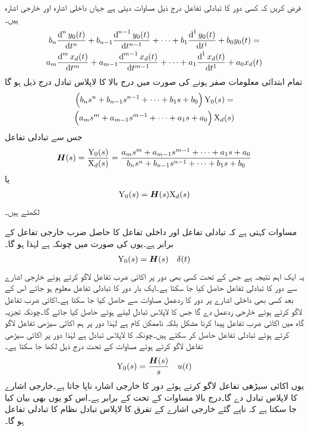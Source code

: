 فرض کریں کہ کسی دور کا تبادلی تفاعل درج ذیل مساوات دیتی ہے جہاں  داخلی اشارہ اور  خارجی اشارہ ہیں۔
\begin{multline*}
b_n\frac{\dif^{\, n} y_0(t)}{\dif t^{n}}+b_{n-1}\frac{\dif^{\, n-1} y_0(t)}{\dif t^{n-1}}+\cdots+b_{1}\frac{\dif^{\, 1} y_0(t)}{\dif t^{1}}+b_0 y_0(t)=\\
a_m\frac{\dif^{\, m} x_d(t)}{\dif t^{m}}+a_{m-1}\frac{\dif^{\, m-1} x_d(t)}{\dif t^{m-1}}+\cdots+a_{1}\frac{\dif^{\, 1} x_d(t)}{\dif t^{1}}+a_0 x_d(t)
\end{multline*}
تمام ابتدائی معلومات صفر ہونے کی صورت میں درج بالا کا لاپلاس تبادل درج ذیل ہو گا
\begin{multline*}
\left(b_n s^n+b_{n-1}s^{n-1}+\cdots +b_1 s+b_0\right){{{\textup{Y}}}_0(s)}=\\
\left(a_m s^m+a_{m-1}s^{m-1}+\cdots+a_1 s+a_0\right){{{\textup{X}}}_d(s)}
\end{multline*}
جس سے تبادلی تفاعل  
\begin{align*}
{\ensuremath{{\boldsymbol{H}}}}(s)=\frac{{{\textup{Y}}}_0(s)}{{{\textup{X}}}_d(s)}=\frac{a_m s^m+a_{m-1}s^{m-1}+\cdots+a_1 s+a_0}{b_n s^n+b_{n-1}s^{n-1}+\cdots +b_1 s+b_0}
\end{align*}
یا
\begin{align}\label{مساوات_لاپلاس_استعمال_عمومی_الف}
{{\ensuremath{{\textup{Y}}}}_0(s)}={{\boldsymbol{H}}}(s){{{\textup{X}}}_d(s)}
\end{align}
لکھتے ہیں۔

مساوات  کہتی ہے کہ تبادلی تفاعل  اور داخلی تفاعل  کا حاصل ضرب خارجی
 تفاعل  کے برابر ہے۔یوں  کی صورت میں چونکہ  ہے لہٰذا  ہو گا۔
\begin{align}\label{مساوات_لاپلاس_استعمال_تبادلی_تفاعل_اور_خارجی_اشارہ}
{{\ensuremath{{\textup{Y}}}}_0(s)}={{\boldsymbol{H}}}(s)\quad  \delta(t)
\end{align}
یہ ایک اہم نتیجہ ہے جس کے تحت کسی بھی دور پر اکائی ضرب تفاعل لاگو کرتے ہوئے خارجی اشارے سے دور کا تبادلی تفاعل حاصل کیا جا سکتا ہے۔ایک بار دور کا تبادلی تفاعل معلوم ہو جائے اس کے بعد کسی بھی داخلی اشارے پر دور کا ردعمل مساوات  سے حاصل کیا جا سکتا ہے۔اکائی ضرب تفاعل لاگو کرتے ہوئے خارجی ردعمل  دے گا جس کا لاپلاس تبادل لیتے ہوئے  حاصل کیا جائے گا۔چونکہ تجزیہ گاہ میں اکائی ضرب تفاعل پیدا کرنا مشکل بلکہ ناممکن کام ہے لہٰذا دور پر  ہم اکائی سیڑھی تفاعل لاگو کرتے ہوئے تبادلی تفاعل حاصل کر سکتے ہیں۔چونکہ  کا لاپلاس تبادل  ہے لہٰذا دور پر اکائی سیڑھی تفاعل لاگو کرتے ہوئے مساوات  کے تحت درج ذیل لکھا جا سکتا ہے۔
\begin{align}
{{\ensuremath{{\textup{Y}}}}_0(s)}=\frac{{{\boldsymbol{H}}}(s)}{s} \quad u(t)
\end{align}
یوں اکائی سیڑھی تفاعل لاگو کرتے ہوئے دور کا خارجی اشارہ  ناپا جاتا ہے۔خارجی اشارے کا لاپلاس تبادل  دے گا۔درج بالا مساوات کے تحت  کے برابر ہے۔اس کو یوں بھی بیان کیا جا سکتا ہے کہ ناپے گئے خارجی اشارے کے تفرق  کا لاپلاس تبادل نظام کا تبادلی تفاعل  ہو گا۔


